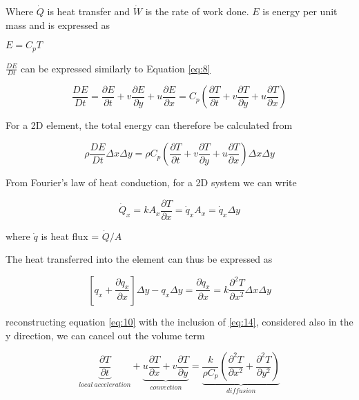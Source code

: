     Where $\dot{Q}$ is heat transfer and $\dot{W}$ is the rate of work done. $E$ is energy per unit mass and is expressed as

    \centerline{$E = C_{p} T$}

    $\frac{DE}{Dt}$ can be expressed similarly to Equation \ref{eq:8}

    \begin{equation} \label{eq:11}
      \frac{DE}{Dt} = \frac{\partial E}{\partial t} + v \frac{\partial E}{\partial y} + u \frac{\partial E}{\partial x} = C_{p} (\frac{\partial T}{\partial t} + v \frac{\partial T}{\partial y} + u \frac{\partial T}{\partial x})
    \end{equation}

    For a 2D element, the total energy can therefore be calculated from

    \begin{equation} \label{eq:12}
      \rho \frac{DE}{Dt} \Delta x \Delta y = \rho   C_{p} (\frac{\partial T}{\partial t} + v \frac{\partial T}{\partial y} + u \frac{\partial T}{\partial x}) \Delta x \Delta y
    \end{equation}

    From Fourier's law of heat conduction, for a 2D system we can write

    \begin{equation} \label{eq:13}
      \dot{Q}_{x} = k A_{x} \frac{\partial T}{\partial x} = \dot{q}_{x} A_{x} = \dot{q}_{x} \Delta y
    \end{equation}

    where $\dot{q}$ is heat flux = $\dot{Q}/A$

    The heat transferred into the element can thus be expressed as

    \begin{equation} \label{eq:14}
      [q_{x} + \frac{\partial q_{x}}{\partial x}] \Delta y - q_{x} \Delta y = \frac{\partial q_{x}}{\partial x} = k \frac{\partial^2 T}{\partial x^2} \Delta x \Delta y
    \end{equation}

    reconstructing equation \ref{eq:10} with the inclusion of \ref{eq:14}, considered also in the y direction, we can cancel out the volume term

    \begin{equation} \label{eq:15}
      \underbrace{\frac{\partial T}{\partial t}}_{local\ acceleration} + \underbrace{u \frac{\partial T}{\partial x} + v \frac{\partial T}{\partial y}}_{convection} = \underbrace{\frac{k}{\rho C_{p}} ( \frac{\partial^2 T}{\partial x^2} + \frac{\partial^2 T}{\partial y^2} )}_{diffusion}
    \end{equation}

